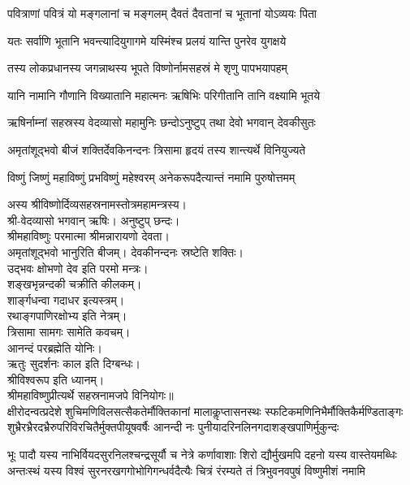 \twolineshloka
{पवित्राणां पवित्रं यो मङ्गलानां च मङ्गलम्}
{दैवतं दैवतानां च भूतानां योऽव्ययः पिता}

\twolineshloka
{यतः सर्वाणि भूतानि भवन्त्यादियुगागमे}
{यस्मिंश्च प्रलयं यान्ति पुनरेव युगक्षये}

\twolineshloka
{तस्य लोकप्रधानस्य जगन्नाथस्य भूपते}
{विष्णोर्नामसहस्रं मे शृणु पापभयापहम्}

\twolineshloka
{यानि नामानि गौणानि विख्यातानि महात्मनः}
{ऋषिभिः परिगीतानि तानि वक्ष्यामि भूतये}

\twolineshloka
{ऋषिर्नाम्नां सहस्रस्य वेदव्यासो महामुनिः}
{छन्दोऽनुष्टुप् तथा देवो भगवान् देवकीसुतः}

\twolineshloka
{अमृतांशूद्भवो बीजं शक्तिर्देवकिनन्दनः}
{त्रिसामा हृदयं तस्य शान्त्यर्थे विनियुज्यते}

\twolineshloka
{विष्णुं जिष्णुं महाविष्णुं प्रभविष्णुं महेश्वरम्}
{अनेकरूपदैत्यान्तं नमामि पुरुषोत्तमम्}

अस्य श्रीविष्णोर्दिव्यसहस्रनामस्तोत्रमहामन्त्रस्य।\\
श्री-वेदव्यासो भगवान् ऋषिः। अनुष्टुप् छन्दः।\\
श्रीमहाविष्णुः परमात्मा श्रीमन्नारायणो देवता।\\
अमृतांशूद्भवो भानुरिति बीजम्। देवकीनन्दनः स्रष्टेति शक्तिः।\\
उद्भवः क्षोभणो देव इति परमो मन्त्रः।\\
शङ्खभृन्नन्दकी चक्रीति कीलकम्।\\
शार्ङ्गधन्वा गदाधर इत्यस्त्रम्। \\
रथाङ्गपाणिरक्षोभ्य इति नेत्रम्। \\
त्रिसामा सामगः सामेति कवचम्।\\
आनन्दं परब्रह्मेति योनिः।\\
ऋतुः सुदर्शनः काल इति दिग्बन्धः। \\
श्रीविश्वरूप इति ध्यानम्।\\
श्रीमहाविष्णुप्रीत्यर्थे सहस्रनामजपे विनियोगः॥\\

\resetShloka
\setlength{\shlokaspaceskip}{12pt}
\fourlineindentedshloka
{क्षीरोदन्वत्प्रदेशे शुचिमणिविलसत्सैकतेर्मौक्तिकानां}
{मालाकॢप्तासनस्थः स्फटिकमणिनिभैर्मौक्तिकैर्मण्डिताङ्गः}
{शुभ्रैरभ्रैरदभ्रैरुपरिविरचितैर्मुक्तपीयूषवर्षैः}
{आनन्दी नः पुनीयादरिनलिनगदाशङ्खपाणिर्मुकुन्दः}

\fourlineindentedshloka
{भूः पादौ यस्य नाभिर्वियदसुरनिलश्चन्द्रसूर्यौ च नेत्रे}
{कर्णावाशाः शिरो द्यौर्मुखमपि दहनो यस्य वास्तेयमब्धिः}
{अन्तःस्थं यस्य विश्वं सुरनरखगगोभोगिगन्धर्वदैत्यैः}
{चित्रं रंरम्यते तं त्रिभुवनवपुषं विष्णुमीशं नमामि}

